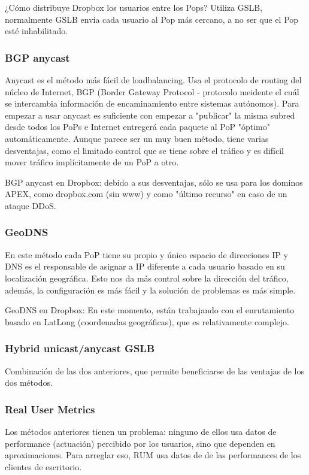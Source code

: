 ¿Cómo distribuye Dropbox los usuarios entre los Pops? Utiliza GSLB, normalmente GSLB envía cada usuario al Pop más cercano, a no ser que el Pop esté inhabilitado.

\subsubsection{BGP anycast}
Anycast es el método más fácil de loadbalancing. Usa el protocolo de routing del núcleo de Internet, BGP (Border Gateway Protocol - protocolo meidente el cuál se intercambia información de encaminamiento entre sistemas autónomos). Para empezar a usar anycast es suficiente con empezar a "publicar" la misma subred desde todos los PoPs e Internet entregerá cada paquete al PoP "óptimo" automáticamente. Aunque parece ser un muy buen método, tiene varias desventajas, como el limitado control que se tiene sobre el tráfico y es difícil mover tráfico implícitamente de un PoP a otro.

BGP anycast en Dropbox: debido a sus desventajas, sólo se usa para los dominos APEX, como dropbox.com (sin www) y como "último recurso" en caso de un ataque DDoS.

\subsubsection{GeoDNS}
En este método cada PoP tiene su propio y único espacio de direcciones IP y DNS es el responsable de asignar a IP diferente a cada usuario basado en su localización geográfica. Esto nos da más control sobre la dirección del tráfico, además, la configuración es más fácil y la solución de problemas es más simple.

GeoDNS en Dropbox: En este momento, están trabajando con el enrutamiento basado en LatLong (coordenadas geográficas), que es relativamente complejo.

\subsubsection{Hybrid unicast/anycast GSLB}

Combinación de las dos anteriores, que permite beneficiarse de las ventajas de los dos métodos.

\subsubsection{Real User Metrics}
Los métodos anteriores tienen un problema: ninguno de ellos usa datos de performance (actuación) percibido por los usuarios, sino que dependen en aproximaciones. Para arreglar eso, RUM usa datos de de las performances de los clientes de escritorio.

